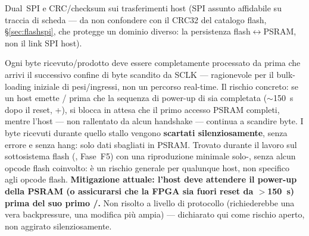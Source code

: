 \begin{fnnote}
Dual~SPI e CRC/checksum sui trasferimenti host (SPI assunto affidabile su traccia di
scheda --- da non confondere con il CRC32 del catalogo flash, §\ref{sec:flashspi}, che
protegge un dominio diverso: la persistenza flash$\leftrightarrow$PSRAM, non il link SPI
host).
\end{fnnote}

\begin{fnwarn}
Ogni byte ricevuto/prodotto deve essere completamente processato da 
prima che arrivi il successivo confine di byte scandito da SCLK --- ragionevole per il
bulk-loading iniziale di pesi/ingressi, non un percorso real-time. Il rischio concreto: se
un host emette / prima che la sequenza di power-up di
 sia completata ($\sim$150~\textmu s dopo il reset,
+),  si blocca in attesa che il
primo accesso PSRAM completi, mentre l'host --- non rallentato da alcun handshake ---
continua a scandire byte. I byte ricevuti durante quello stallo vengono \textbf{scartati
silenziosamente}, senza errore e senza hang: solo dati sbagliati in PSRAM. Trovato durante
il lavoro sul sottosistema flash (, Fase~F5) con una riproduzione minimale
solo-, senza alcun opcode flash coinvolto: è un rischio generale per
qualunque host, non specifico agli opcode flash. \textbf{Mitigazione attuale: l'host deve
attendere il power-up della PSRAM (o assicurarsi che la FPGA sia fuori reset da
$>$150~\textmu s) prima del suo primo /.} Non risolto a livello
di protocollo (richiederebbe una vera backpressure, una modifica più ampia) ---
dichiarato qui come rischio aperto, non aggirato silenziosamente.
\end{fnwarn}
